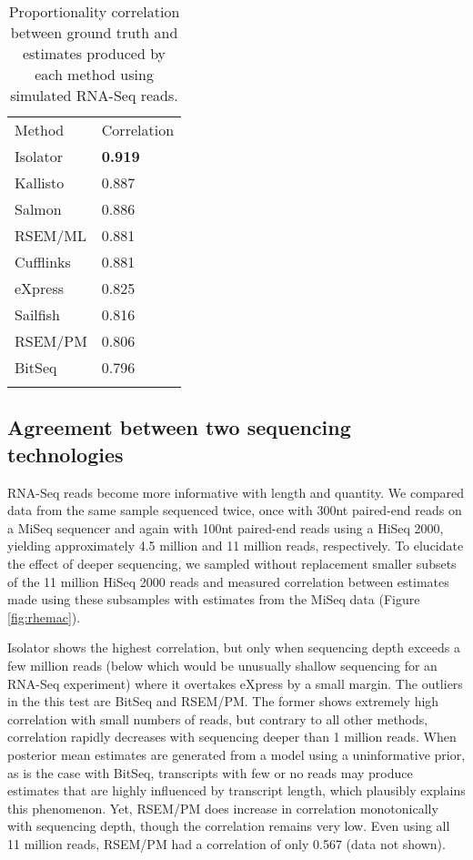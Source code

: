 \documentclass[twocolumn]{article}
\begin{document}
\begin{table}
\begin{tabular}[c]{@{}ll@{}}
\toprule\addlinespace
Method & Correlation
\\\addlinespace
\midrule
Isolator & \textbf{0.919}
\\\addlinespace
Kallisto & 0.887
\\\addlinespace
Salmon & 0.886
\\\addlinespace
RSEM/ML & 0.881
\\\addlinespace
Cufflinks & 0.881
\\\addlinespace
eXpress & 0.825
\\\addlinespace
Sailfish & 0.816
\\\addlinespace
RSEM/PM & 0.806
\\\addlinespace
BitSeq & 0.796
\\\addlinespace
\bottomrule
\addlinespace
\end{tabular}
\caption{
Proportionality correlation between ground truth and estimates
produced by each method using simulated RNA-Seq reads.}
\label{table:rlsim}
\end{table}


\subsection{Agreement between two sequencing
technologies}\label{agreement-between-two-sequencing-technologies}

RNA-Seq reads become more informative with length and quantity. We
compared data from the same sample sequenced twice, once with 300nt
paired-end reads on a MiSeq sequencer and again with 100nt paired-end
reads using a HiSeq 2000, yielding approximately 4.5 million and 11
million reads, respectively. To elucidate the effect of deeper
sequencing, we sampled without replacement smaller subsets of the 11
million HiSeq 2000 reads and measured correlation between estimates made using
these subsamples with estimates from the MiSeq data (Figure \ref{fig:rhemac}).

Isolator shows the highest correlation, but only when sequencing depth
exceeds a few million reads (below which would be unusually shallow
sequencing for an RNA-Seq experiment) where it overtakes eXpress by a small
margin. The outliers in the this test are BitSeq and RSEM/PM. The former
shows extremely high correlation with small numbers of reads, but
contrary to all other methods, correlation rapidly decreases with
sequencing deeper than 1 million reads. When posterior mean estimates are
generated from a model using a uninformative prior, as is the case with
BitSeq, transcripts with few or no reads may produce estimates that are
highly influenced by transcript length, which plausibly explains this
phenomenon. Yet, RSEM/PM does increase in correlation monotonically with
sequencing depth, though the correlation remains very low. Even using
all 11 million reads, RSEM/PM had a correlation of only 0.567 (data not shown).
\end{document}
